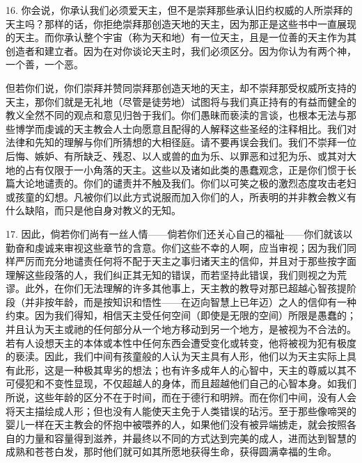 16. 你会说，你承认我们必须爱天主，但不是崇拜那些承认旧约权威的人所崇拜的天主吗？那样的话，你拒绝崇拜那创造天地的天主，因为那正是这些书中一直展现的天主。而你承认整个宇宙（称为天和地）有一位天主，且是一位善的天主作为其创造者和建立者。因为在对你谈论天主时，我们必须区分。因为你认为有两个神，一个善，一个恶。\par

但若你们说，你们崇拜并赞同崇拜那创造天地的天主，却不崇拜那受权威所支持的天主，那你们就是无礼地（尽管是徒劳地）试图将与我们真正持有的有益而健全的教义全然不同的观点和意见归咎于我们。你们愚昧而亵渎的言谈，也根本无法与那些博学而虔诚的天主教会人士向愿意且配得的人解释这些圣经的注释相比。我们对法律和先知的理解与你们所猜想的大相径庭。请不要再误会我们。我们不崇拜一位后悔、嫉妒、有所缺乏、残忍、以人或兽的血为乐、以罪恶和过犯为乐、或其对大地的占有仅限于一小角落的天主。这些以及诸如此类的愚蠢观念，正是你们惯于长篇大论地谴责的。你们的谴责并不触及我们。你们以可笑之极的激烈态度攻击老妇或孩童的幻想。凡被你们以此方式说服而加入你们的人，所表明的并非教会教义有什么缺陷，而只是他自身对教义的无知。\par

17. 因此，倘若你们尚有一丝人情——倘若你们还关心自己的福祉——你们就该以勤奋和虔诚来审视这些章节的含意。你们这些不幸的人啊，应当审视；因为我们同样严厉而充分地谴责任何将不配于天主之事归诸天主的信仰，并且对于那些按字面理解这些段落的人，我们纠正其无知的错误，而若坚持此错误，我们则视之为荒谬。此外，在你们无法理解的许多其他事上，天主教的教导对那已超越心智孩提阶段（并非按年龄，而是按知识和悟性——在迈向智慧上已年迈）之人的信仰有一种约束。因为我们得知，相信天主受任何空间（即使是无限的空间）所限是愚蠢的；并且认为天主或祂的任何部分从一个地方移动到另一个地方，是被视为不合法的。若有人设想天主的本体或本性中任何东西会遭受变化或转变，他将被视为犯有极度的亵渎。因此，我们中间有孩童般的人认为天主具有人形，他们以为天主实际上具有此形，这是一种极其卑劣的想法；也有许多成年人的心智中，天主的尊威以其不可侵犯和不变性显现，不仅超越人的身体，而且超越他们自己的心智本身。如我们所说，这些年龄的区分不在于时间，而在于德行和明辨。而在你们中间，没有人会将天主描绘成人形；但也没有人能使天主免于人类错误的玷污。至于那些像啼哭的婴儿一样在天主教会的怀抱中被喂养的人，如果他们没有被异端掳走，就会按照各自的力量和容量得到滋养，并最终以不同的方式达到完美的成人，进而达到智慧的成熟和苍苍白发，那时他们就可如其所愿地获得生命，获得圆满幸福的生命。\par


